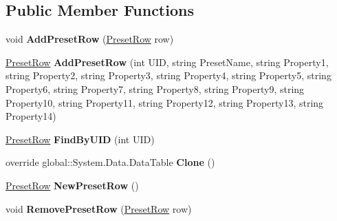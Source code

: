 \subsection*{Public Member Functions}
\begin{DoxyCompactItemize}
\item 
void {\bfseries Add\+Preset\+Row} (\hyperlink{class_products_1_1_data_1_1ds_sage_1_1_preset_row}{Preset\+Row} row)\hypertarget{class_products_1_1_data_1_1ds_sage_1_1_preset_data_table_a93a486c141a35cac4db8856af3a69403}{}\label{class_products_1_1_data_1_1ds_sage_1_1_preset_data_table_a93a486c141a35cac4db8856af3a69403}

\item 
\hyperlink{class_products_1_1_data_1_1ds_sage_1_1_preset_row}{Preset\+Row} {\bfseries Add\+Preset\+Row} (int U\+ID, string Preset\+Name, string Property1, string Property2, string Property3, string Property4, string Property5, string Property6, string Property7, string Property8, string Property9, string Property10, string Property11, string Property12, string Property13, string Property14)\hypertarget{class_products_1_1_data_1_1ds_sage_1_1_preset_data_table_a485e36a857aafcdf28a47ed7c1d857bb}{}\label{class_products_1_1_data_1_1ds_sage_1_1_preset_data_table_a485e36a857aafcdf28a47ed7c1d857bb}

\item 
\hyperlink{class_products_1_1_data_1_1ds_sage_1_1_preset_row}{Preset\+Row} {\bfseries Find\+By\+U\+ID} (int U\+ID)\hypertarget{class_products_1_1_data_1_1ds_sage_1_1_preset_data_table_a30aaf79cf9f6b414e1ad00036b1d21b3}{}\label{class_products_1_1_data_1_1ds_sage_1_1_preset_data_table_a30aaf79cf9f6b414e1ad00036b1d21b3}

\item 
override global\+::\+System.\+Data.\+Data\+Table {\bfseries Clone} ()\hypertarget{class_products_1_1_data_1_1ds_sage_1_1_preset_data_table_a2d73f75c4e0a8ca36c34a38158bb3e72}{}\label{class_products_1_1_data_1_1ds_sage_1_1_preset_data_table_a2d73f75c4e0a8ca36c34a38158bb3e72}

\item 
\hyperlink{class_products_1_1_data_1_1ds_sage_1_1_preset_row}{Preset\+Row} {\bfseries New\+Preset\+Row} ()\hypertarget{class_products_1_1_data_1_1ds_sage_1_1_preset_data_table_a13487d335d82af9dc70d7cb2fd71104d}{}\label{class_products_1_1_data_1_1ds_sage_1_1_preset_data_table_a13487d335d82af9dc70d7cb2fd71104d}

\item 
void {\bfseries Remove\+Preset\+Row} (\hyperlink{class_products_1_1_data_1_1ds_sage_1_1_preset_row}{Preset\+Row} row)\hypertarget{class_products_1_1_data_1_1ds_sage_1_1_preset_data_table_a881ed9cd54b9ff01ae5587a13a39edf6}{}\label{class_products_1_1_data_1_1ds_sage_1_1_preset_data_table_a881ed9cd54b9ff01ae5587a13a39edf6}

\end{DoxyCompactItemize}
